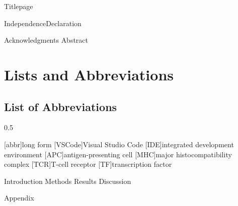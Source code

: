 \documentclass[12pt,a4paper, twoside]{article}
\begin{document}
{Titlepage}

\setcounter{page}{1}
\pagestyle{fancy}
\fancyhf{}
\fancyhead[C]{\nouppercase{\leftmark}}
\fancyfoot[RO, LE]{\thepage} %
{IndependenceDeclaration}
% 

% 
{Acknowledgments}
{Abstract}
\newpage
\tableofcontents
{}
\newpage
\section*{Lists and Abbreviations}
\listoffigures
\listoftables
\subsection*{List of Abbreviations}
\vspace{12pt}
\begin{spacing}{0.5}
\begin{acronym}
    [abbr]{long form}
    [VSCode]{Visual Studio Code}
    [IDE]{integrated development environment}
    [APC]{antigen-presenting cell}
    [MHC]{major histocompatibility complex}
    [TCR]{T-cell receptor}
    [TF]{transcription factor}
\end{acronym}
\end{spacing}

\clearpage

\fancyhf{}
\setcounter{page}{1}
\fancyhead[C]{\nouppercase{\leftmark}}
\fancyfoot[RE, LO]{\thepage} %
{Introduction}
\clearpage
{Methods}
\clearpage
{Results}
\clearpage
{Discussion}

\clearpage
\printbibliography
{}
\clearpage
{Appendix}
\newpage
\end{document}
